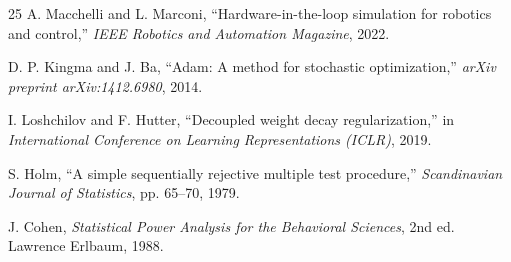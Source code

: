 \documentclass[conference]{IEEEtran}
\begin{document}
\begin{thebibliography}{25}
 A. Macchelli and L. Marconi, ``Hardware-in-the-loop simulation for robotics and control,'' \textit{IEEE Robotics and Automation Magazine}, 2022.

 D. P. Kingma and J. Ba, ``Adam: A method for stochastic optimization,'' \textit{arXiv preprint arXiv:1412.6980}, 2014.

 I. Loshchilov and F. Hutter, ``Decoupled weight decay regularization,'' in \textit{International Conference on Learning Representations (ICLR)}, 2019.

 S. Holm, ``A simple sequentially rejective multiple test procedure,'' \textit{Scandinavian Journal of Statistics}, pp. 65--70, 1979.

 J. Cohen, \textit{Statistical Power Analysis for the Behavioral Sciences}, 2nd ed. Lawrence Erlbaum, 1988.

\end{thebibliography}
\end{document}
